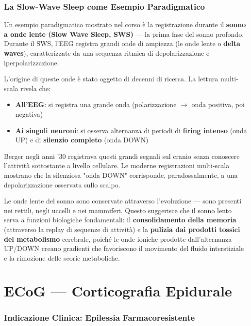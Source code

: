 \subsubsection{La Slow-Wave Sleep come Esempio Paradigmatico}

Un esempio paradigmatico mostrato nel corso è la registrazione durante il \textbf{sonno a onde lente (Slow Wave Sleep, SWS)} — la prima fase del sonno profondo. Durante il SWS, l'EEG registra grandi onde di ampiezza (le onde lente o \textbf{delta waves}), caratterizzate da una sequenza ritmica di depolarizzazione e iperpolarizzazione.

L'origine di queste onde è stato oggetto di decenni di ricerca. La lettura multi-scala rivela che:

\begin{itemize}
    \item \textbf{All'EEG}: si registra una grande onda (polarizzazione $\rightarrow$ onda positiva, poi negativa)
    \item \textbf{Ai singoli neuroni}: si osserva alternanza di periodi di \textbf{firing intenso} (onda UP) e di \textbf{silenzio completo} (onda DOWN)
\end{itemize}

Berger negli anni '30 registrava questi grandi segnali sul cranio senza conoscere l'attività sottostante a livello cellulare. Le moderne registrazioni multi-scala mostrano che la silenziosa "onda DOWN" corrisponde, paradossalmente, a una depolarizzazione osservata sullo scalpo.

Le onde lente del sonno sono conservate attraverso l'evoluzione — sono presenti nei rettili, negli uccelli e nei mammiferi. Questo suggerisce che il sonno lento serva a funzioni biologiche fondamentali: il \textbf{consolidamento della memoria} (attraverso la replay di sequenze di attività) e la \textbf{pulizia dai prodotti tossici del metabolismo} cerebrale, poiché le onde ioniche prodotte dall'alternanza UP/DOWN creano gradienti che favoriscono il movimento del fluido interstiziale e la rimozione delle scorie metaboliche.

\section{ECoG — Corticografia Epidurale}

\subsubsection{Indicazione Clinica: Epilessia Farmacoresistente}


